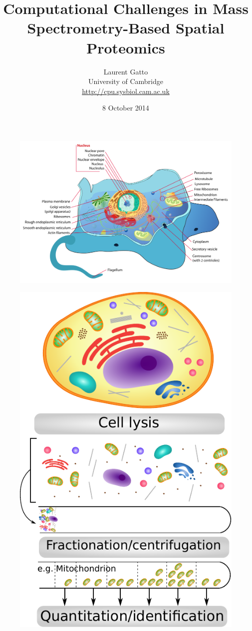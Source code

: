 \documentclass[presentation]{beamer}
\author{Laurent Gatto\\
University of Cambridge\\
\url{http://cpu.sysbiol.cam.ac.uk}}
\date{8 October 2014}
\title{Computational Challenges in Mass Spectrometry-Based Spatial Proteomics}
\begin{document}
\maketitle


\begin{frame}
  \begin{figure}[h]
    \centering
    \includegraphics[width=.8\linewidth]{./figures/Animal_cell_structure.png}
  \end{figure}
\end{frame}

\begin{frame}
  \begin{figure}[h]
    \centering
    \includegraphics[width=.45\linewidth]{./figures/expdesign.pdf}
  \end{figure}
\end{frame}
\end{document}
